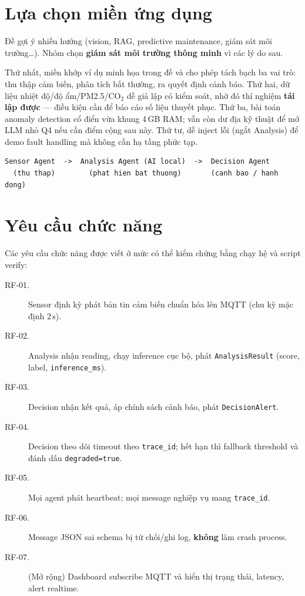 \documentclass[12pt,a4paper,oneside]{report}
\newcommand{\code}[1]{\texttt{#1}}
\begin{document}
\section{Lựa chọn miền ứng dụng}

Đề gợi ý nhiều hướng (vision, RAG, predictive maintenance, giám sát môi trường\ldots). Nhóm chọn \textbf{giám sát môi trường thông minh} vì các lý do sau.

Thứ nhất, miền khớp ví dụ minh họa trong đề và cho phép tách bạch ba vai trò: thu thập cảm biến, phân tích bất thường, ra quyết định cảnh báo. Thứ hai, dữ liệu nhiệt độ/độ ẩm/PM2.5/CO$_2$ dễ giả lập có kiểm soát, nhờ đó thí nghiệm \textbf{tái lập được} --- điều kiện cần để báo cáo số liệu thuyết phục. Thứ ba, bài toán anomaly detection cổ điển vừa khung 4\,GB RAM; vẫn còn dư địa kỹ thuật để mở LLM nhỏ Q4 nếu cần điểm cộng sau này. Thứ tư, dễ inject lỗi (ngắt Analysis) để demo fault handling mà không cần hạ tầng phức tạp.

\begin{lstlisting}[caption={Pipeline nghiệp vụ của miền giám sát môi trường},label=lst:pipeline]
Sensor Agent  ->  Analysis Agent (AI local)  ->  Decision Agent
  (thu thap)        (phat hien bat thuong)       (canh bao / hanh dong)
\end{lstlisting}

\section{Yêu cầu chức năng}

Các yêu cầu chức năng được viết ở mức có thể kiểm chứng bằng chạy hệ và script verify:
\begin{description}
  \item[RF-01.] Sensor định kỳ phát bản tin cảm biến chuẩn hóa lên MQTT (chu kỳ mặc định 2\,s).
  \item[RF-02.] Analysis nhận reading, chạy inference cục bộ, phát \code{AnalysisResult} (score, label, \code{inference\_ms}).
  \item[RF-03.] Decision nhận kết quả, áp chính sách cảnh báo, phát \code{DecisionAlert}.
  \item[RF-04.] Decision theo dõi timeout theo \code{trace\_id}; hết hạn thì fallback threshold và đánh dấu \code{degraded=true}.
  \item[RF-05.] Mọi agent phát heartbeat; mọi message nghiệp vụ mang \code{trace\_id}.
  \item[RF-06.] Message JSON sai schema bị từ chối/ghi log, \textbf{không} làm crash process.
  \item[RF-07.] (Mở rộng) Dashboard subscribe MQTT và hiển thị trạng thái, latency, alert realtime.
\end{description}
\end{document}
